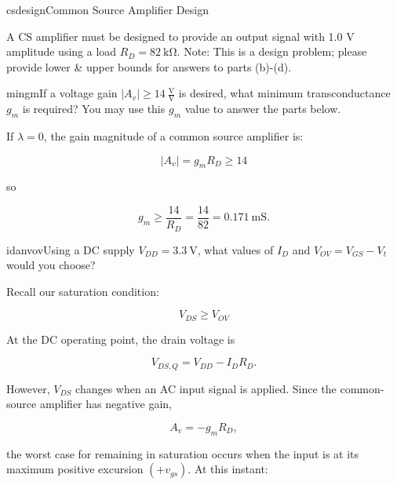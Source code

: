 \begin{mainquestion}{csdesign}{Common Source Amplifier Design}

A CS amplifier must be designed to provide an output signal with 1.0 V amplitude using a load $R_{D} = \qty{82}{\kilo\ohm}$. Note: This is a design problem; please provide lower \& upper bounds for answers to parts (b)-(d).

\begin{partquestion}{mingm}{If a voltage gain $\left|A_{v}\right| \geq 14\ \frac{\text{V}}{\text{V}}$ is desired, what minimum transconductance $g_{m}$ is required? You may use this $g_{m}$ value to answer the parts below.}
\begin{answer}
If $\lambda = 0$, the gain magnitude of a common source amplifier is:

\[
\left|A_{v}\right| = g_{m} R_{D} \geq 14
\]

so

\[
g_{m} \geq \frac{14}{R_{D}} = \frac{14}{82} = \qty{0.171}{\milli\siemens}.
\]
\end{answer}
\end{partquestion}

\begin{partquestion}{idanvov}{Using a DC supply $V_{DD} = \qty{3.3}{\volt}$, what values of $I_{D}$ and $V_{OV} = V_{GS} - V_{t}$ would you choose?}
\begin{answer}
\begin{kaitlyn}

\noindent{}%

Recall our saturation condition:

\[\boxed{V_{DS} \geq V_{OV}}\]

At the DC operating point, the drain voltage is

\[V_{DS,Q} = V_{DD} - I_D R_D.\]

However, $V_{DS}$ changes when an AC input signal is applied. Since the common-source amplifier has negative gain,

\[A_v = -g_mR_D,\]

the worst case for remaining in saturation occurs when the input is at its maximum positive excursion $(+v_{gs})$. At this instant:


\end{kaitlyn}
\end{answer}
\end{partquestion}
\end{mainquestion}
